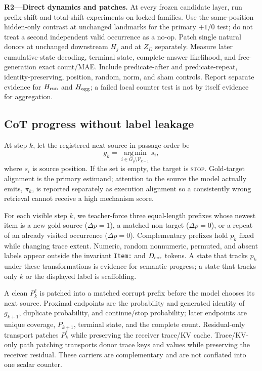 \begin{todobox}
\textbf{R2---Direct dynamics and patches.}
At every frozen candidate layer, run prefix-shift and total-shift experiments
on locked families. Use the same-position hidden-only contrast at unchanged
landmarks for the primary \(+1/0\) test; do not treat a second independent
valid occurrence as a no-op. Patch single natural donors at unchanged
downstream \(H_j\) and at \(Z_D\) separately. Measure later cumulative-state
decoding, terminal state, complete-answer likelihood, and free-generation
exact count/MAE. Include predicate-after and predicate-repeat,
identity-preserving, position, random, norm, and sham controls. Report
separate evidence for \(H_{\rm run}\) and \(H_{\rm agg}\); a failed local
counter test is not by itself evidence for aggregation.
\end{todobox}

\subsection{CoT progress without label leakage}

At step \(k\), let the registered next source in passage order be
\begin{equation}
  g_k=
  \operatorname*{arg\,min}_{i\in G_q\setminus\mathcal V_{k-1}} s_i,
\label{eq:gold-next}
\end{equation}
where \(s_i\) is source position. If the set is empty, the target is
\textsc{stop}. Gold-target alignment is the primary estimand; attention to
the source the model actually emits, \(\pi_k\), is reported separately as
execution alignment so a consistently wrong retrieval cannot receive a high
mechanism score.

For each visible step \(k\), we teacher-force three equal-length prefixes whose
newest item is a new gold source (\(\Delta p=1\)), a matched non-target
(\(\Delta p=0\)), or a repeat of an already visited occurrence
(\(\Delta p=0\)). Complementary prefixes hold \(p_k\) fixed while changing
trace extent. Numeric, random nonnumeric, permuted, and absent labels appear
outside the invariant \texttt{Item:} and \(D_{\rm eor}\) tokens. A state that
tracks \(p_k\) under these transformations is evidence for semantic progress;
a state that tracks only \(k\) or the displayed label is scaffolding.

A clean \(P_k^\ell\) is patched into a matched corrupt prefix before the model
chooses its next source. Proximal endpoints are the probability and generated
identity of \(g_{k+1}\), duplicate probability, and continue/stop probability;
later endpoints are unique coverage, \(P_{k+1}\), terminal state, and the
complete count. Residual-only transport patches \(P_k^\ell\) while preserving
the receiver trace/KV cache. Trace/KV-only path patching transports donor
trace keys and values while preserving the receiver residual. These carriers
are complementary and are not conflated into one scalar counter.

